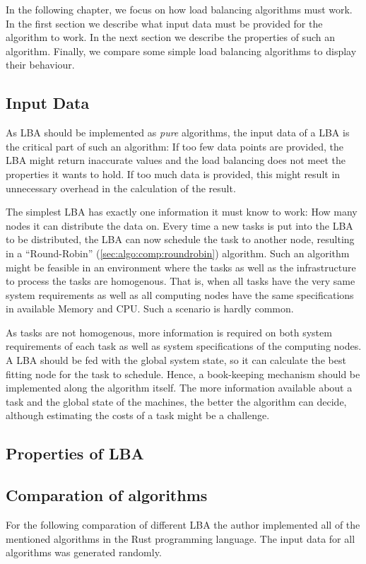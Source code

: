 In the following chapter, we focus on how load balancing algorithms must work.
In the first section we describe what input data must be provided for the
algorithm to work.
In the next section we describe the properties of such an algorithm.
Finally, we compare some simple load balancing algorithms to display their
behaviour.

\subsection{Input Data}
\label{sec:algo:input}

As \ac{LBA} should be implemented as \emph{pure} algorithms,
the input data of a \ac{LBA} is the
critical part of such an algorithm: If too few data points are
provided, the \ac{LBA} might return inaccurate values and the load balancing
does not meet the properties it wants to hold.
If too much data is provided, this might result in unnecessary overhead in the
calculation of the result.

The simplest \ac{LBA} has exactly one information it must know to work: How many
nodes it can distribute the data on.
Every time a new tasks is put into the \ac{LBA} to be distributed, the \ac{LBA}
can now schedule the task to another node, resulting in a ``Round-Robin''
(\ref{sec:algo:comp:roundrobin}) algorithm.
Such an algorithm might be feasible in an environment where the tasks as well as
the infrastructure to process the tasks are homogenous.
That is, when all tasks have the very same system requirements as well as all
computing nodes have the same specifications in available Memory and CPU.
Such a scenario is hardly common.

As tasks are not homogenous, more information is required on both system
requirements of each task as well as system specifications of the computing
nodes.
A \ac{LBA} should be fed with the global system state, so it can calculate the
best fitting node for the task to schedule.
Hence, a book-keeping mechanism should be implemented along the algorithm
itself.
The more information available about a task and the global state of the
machines, the better the algorithm can decide, although estimating the costs of
a task might be a challenge.


\subsection{Properties of \ac{LBA}}
\label{sec:algo:prop}
%

\subsection{Comparation of algorithms}

For the following comparation of different \ac{LBA} the author implemented all
of the mentioned algorithms in the Rust programming language.
The input data for all algorithms was generated randomly.

\label{sec:algo:comp}
